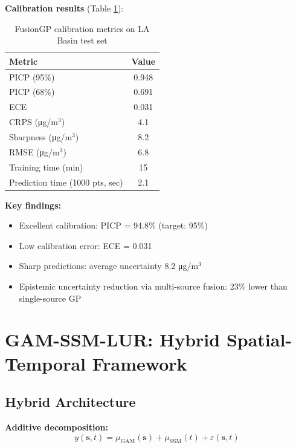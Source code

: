 \documentclass[11pt,letterpaper]{article}
\begin{document}
\textbf{Calibration results} (Table \ref{tab:fusiongp_results}):

\begin{table}[h]
\centering
\caption{FusionGP calibration metrics on LA Basin test set}
\label{tab:fusiongp_results}
\begin{tabular}{@{}lc@{}}
\toprule
\textbf{Metric} & \textbf{Value} \\
\midrule
PICP (95\%) & 0.948 \\
PICP (68\%) & 0.691 \\
ECE & 0.031 \\
CRPS (μg/m$^3$) & 4.1 \\
Sharpness (μg/m$^3$) & 8.2 \\
RMSE (μg/m$^3$) & 6.8 \\
Training time (min) & 15 \\
Prediction time (1000 pts, sec) & 2.1 \\
\bottomrule
\end{tabular}
\end{table}

\textbf{Key findings:}
\begin{itemize}
    \item Excellent calibration: PICP = 94.8\% (target: 95\%)
    \item Low calibration error: ECE = 0.031
    \item Sharp predictions: average uncertainty 8.2 μg/m$^3$
    \item Epistemic uncertainty reduction via multi-source fusion: 23\% lower than single-source GP
\end{itemize}

\section{GAM-SSM-LUR: Hybrid Spatial-Temporal Framework} \label{sec:gamssm}

\subsection{Hybrid Architecture}

\textbf{Additive decomposition:}
\begin{equation}
y(\mathbf{s}, t) = \mu_{\text{GAM}}(\mathbf{s}) + \mu_{\text{SSM}}(t) + \varepsilon(\mathbf{s}, t)
\label{eq:gam_ssm_decomposition}
\end{equation}
\end{document}

